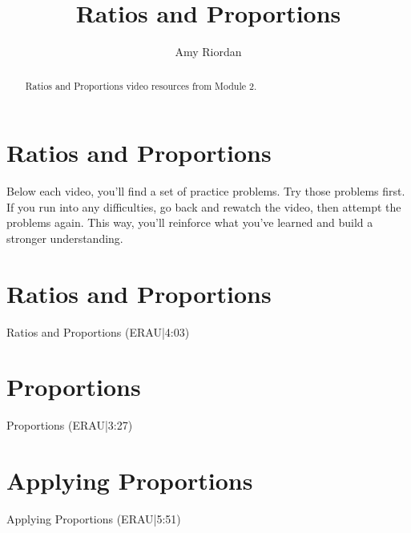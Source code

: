 \documentclass{ximera}
\title{Ratios and Proportions}
\author{Amy Riordan}
\begin{document}
\begin{abstract}
Ratios and Proportions video resources from Module 2.
\end{abstract}
\maketitle

\section*{Ratios and Proportions}

Below each video, you’ll find a set of practice problems. Try those problems first. If you run into any difficulties, go back and rewatch the video, then attempt the problems again. This way, you’ll reinforce what you’ve learned and build a stronger understanding.

\section*{Ratios and Proportions}

Ratios and Proportions (ERAU|4:03)


\section*{Proportions}

Proportions (ERAU|3:27)


\section*{Applying Proportions}

Applying Proportions (ERAU|5:51)

\end{document}
